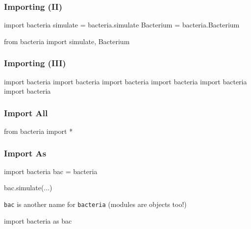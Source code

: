 \begin{frame}[fragile]
\frametitle{Importing (II)}

\begin{python}
import bacteria
simulate = bacteria.simulate
Bacterium = bacteria.Bacterium
\end{python}

\pause

\begin{python}
from bacteria import simulate, Bacterium
\end{python}

\end{frame}

\begin{frame}[fragile]
\frametitle{Importing (III)}

\begin{python}
import bacteria
import bacteria
import bacteria
import bacteria
import bacteria
import bacteria
\end{python}
\end{frame}

\begin{frame}[fragile]
\frametitle{Import All}

\begin{python}
from bacteria import *
\end{python}

\end{frame}

\begin{frame}[fragile]
\frametitle{Import As}

\begin{python}
import bacteria
bac = bacteria

bac.simulate(...)
\end{python}

\lstinline{bac} is another name for \lstinline{bacteria} (modules are objects too!)

\pause

\begin{python}
import bacteria as bac
\end{python}
\end{frame}




